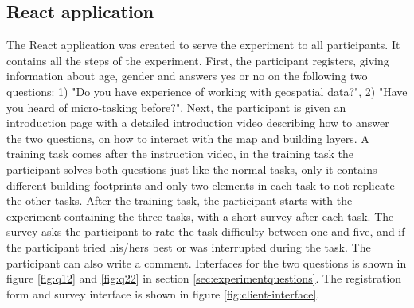 \subsection{React application}
The React application was created to serve the experiment to all participants. It contains all the steps of the experiment. First, the participant registers, giving information about age, gender and answers yes or no on the following two questions: 1) "Do you have experience of working with geospatial data?", 2) "Have you heard of micro-tasking before?". Next, the participant is given an introduction page with a detailed introduction video describing how to answer the two questions, on how to interact with the map and building layers. A training task comes after the instruction video, in the training task the participant solves both questions just like the normal tasks, only it contains different building footprints and only two elements in each task to not replicate the other tasks. After the training task, the participant starts with the experiment containing the three tasks, with a short survey after each task. The survey asks the participant to rate the task difficulty between one and five, and if the participant tried his/hers best or was interrupted during the task. The participant can also write a comment. Interfaces for the two questions is shown in figure \ref{fig:q12} and \ref{fig:q22} in section \ref{sec:experimentquestions}. The registration form and survey interface is shown in figure \ref{fig:client-interface}. 

